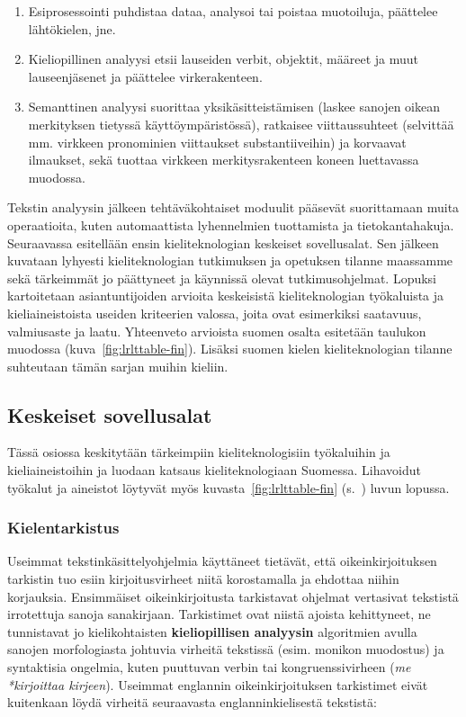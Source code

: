 \begin{multicols}{2}
\begin{enumerate}
\item Esiprosessointi puhdistaa dataa, analysoi tai poistaa muotoiluja,
 päättelee lähtökielen, jne.

\item Kieliopillinen analyysi etsii lauseiden verbit, objektit,
määreet ja muut lauseenjäsenet ja päättelee virkerakenteen.

\item Semanttinen analyysi suorittaa yksikäsitteistämisen (laskee
sanojen oikean merkityksen tietyssä käyttöympäristössä), ratkaisee
viittaussuhteet (selvittää mm. virkkeen pronominien viittaukset
substantiiveihin) ja korvaavat ilmaukset, sekä tuottaa virkkeen
merkitysrakenteen koneen luettavassa muodossa.
\end{enumerate}

Tekstin analyysin jälkeen tehtäväkohtaiset moduulit pääsevät
suorittamaan muita operaatioita, kuten automaattista lyhennelmien
tuottamista ja tietokantahakuja.
Seuraavassa esitellään ensin kieliteknologian keskeiset sovellusalat.
Sen jälkeen kuvataan lyhyesti kieliteknologian tutkimuksen ja
opetuksen tilanne maassamme sekä tärkeimmät jo päättyneet ja käynnissä
olevat tutkimusohjelmat. Lopuksi kartoitetaan asiantuntijoiden
arvioita keskeisistä kieliteknologian työkaluista ja kieliaineistoista
useiden kriteerien valossa, joita ovat esimerkiksi saatavuus,
valmiusaste ja laatu. Yhteenveto arvioista suomen osalta esitetään
taulukon muodossa (kuva~\ref{fig:lrlttable-fin}). Lisäksi suomen
kielen kieliteknologian tilanne suhteutaan tämän sarjan muihin
kieliin.


\subsection{Keskeiset sovellusalat}


Tässä osiossa keskitytään tärkeimpiin kieliteknologisiin työkaluihin
ja kieliaineistoihin ja luodaan katsaus kieliteknologiaan Suomessa.
Lihavoidut työkalut ja aineistot löytyvät myös
kuvasta~\ref{fig:lrlttable-fin} (s.~\pageref{fig:lrlttable-fin}) luvun
lopussa.



\subsubsection{Kielentarkistus}

Useimmat tekstinkäsittelyohjelmia käyttäneet tietävät, että oikeinkirjoituksen 
tarkistin tuo esiin kirjoitusvirheet niitä korostamalla ja ehdottaa niihin
korjauksia. Ensimmäiset oikeinkirjoitusta tarkistavat ohjelmat
vertasivat tekstistä irrotettuja sanoja sanakirjaan. Tarkistimet ovat niistä ajoista 
kehittyneet, ne tunnistavat jo kielikohtaisten \textbf{kieliopillisen analyysin}
algoritmien avulla sanojen morfologiasta johtuvia virheitä tekstissä 
(esim. monikon muodostus) ja syntaktisia ongelmia, kuten
puuttuvan verbin tai kongruenssivirheen (\textit{me *kirjoittaa
kirjeen}). Useimmat englannin oikeinkirjoituksen tarkistimet eivät kuitenkaan
löydä virheitä seuraavasta englanninkielisestä tekstistä:


\end{multicols}
